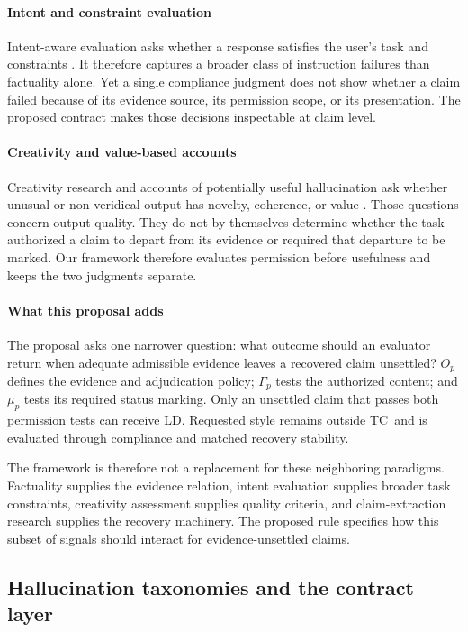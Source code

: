 \documentclass{clv2025}
\newcommand{\TC}{\textsc{TC}}
\newcommand{\LD}{\textsc{LD}}
\begin{document}
\paragraph{Intent and constraint evaluation}
Intent-aware evaluation asks whether a response satisfies the user's task
and constraints \citep{hao_faithqa_2025}.
It therefore captures a broader class of instruction failures than
factuality alone.
Yet a single compliance judgment does not show whether a claim failed
because of its evidence source, its permission scope, or its presentation.
The proposed contract makes those decisions inspectable at claim level.

\paragraph{Creativity and value-based accounts}
Creativity research and accounts of potentially useful hallucination ask
whether unusual or non-veridical output has novelty, coherence, or value
\citep{jiang_survey_2024,sui_confabulation_2024,yang_hicbench_2025}.
Those questions concern output quality.
They do not by themselves determine whether the task authorized a claim to
depart from its evidence or required that departure to be marked.
Our framework therefore evaluates permission before usefulness and keeps
the two judgments separate.

\paragraph{What this proposal adds}
The proposal asks one narrower question: what outcome should an evaluator
return when adequate admissible evidence leaves a recovered claim
unsettled?
$O_p$ defines the evidence and adjudication policy; $\Gamma_p$ tests the
authorized content; and $\mu_p$ tests its required status marking.
Only an unsettled claim that passes both permission tests can receive
\LD.
Requested style remains outside \TC\ and is evaluated through compliance
and matched recovery stability.

The framework is therefore not a replacement for these neighboring
paradigms.
Factuality supplies the evidence relation, intent evaluation supplies
broader task constraints, creativity assessment supplies quality
criteria, and claim-extraction research supplies the recovery machinery.
The proposed rule specifies how this subset of signals should interact for
evidence-unsettled claims.

\subsection{Hallucination taxonomies and the contract layer}
\end{document}
